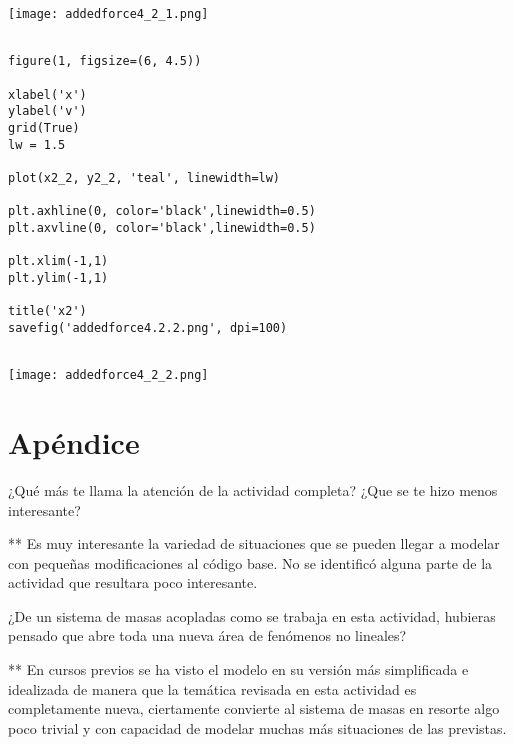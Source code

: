 \documentclass{article} %
\begin{document}
\begin{center}
	\texttt{[image: addedforce4\_2\_1.png]}
\end{center}


\begin{verbatim} 

figure(1, figsize=(6, 4.5))

xlabel('x')
ylabel('v')
grid(True)
lw = 1.5

plot(x2_2, y2_2, 'teal', linewidth=lw)

plt.axhline(0, color='black',linewidth=0.5)
plt.axvline(0, color='black',linewidth=0.5)

plt.xlim(-1,1)
plt.ylim(-1,1)

title('x2')
savefig('addedforce4.2.2.png', dpi=100)


\end{verbatim}


\begin{center}
	\texttt{[image: addedforce4\_2\_2.png]}
\end{center}



\section*{Apéndice}

\hspace{0.45 cm} ¿Qué más te llama la atención de la actividad completa? ¿Que se te hizo menos interesante?

\vspace{0.5 cm}

** Es muy interesante la variedad de situaciones que se pueden llegar a modelar con pequeñas modificaciones al código base. No se identificó alguna parte de la actividad que resultara poco interesante.

\vspace{0.5 cm}


¿De un sistema de masas acopladas como se trabaja en esta actividad, hubieras pensado que abre toda una nueva área de fenómenos no lineales?

\vspace{0.5 cm}

** En cursos previos se ha visto el modelo en su versión más simplificada e idealizada de manera que la temática revisada en esta actividad es completamente nueva, ciertamente convierte al sistema de masas en resorte algo poco trivial y con capacidad de modelar muchas más situaciones de las previstas.
\end{document}
